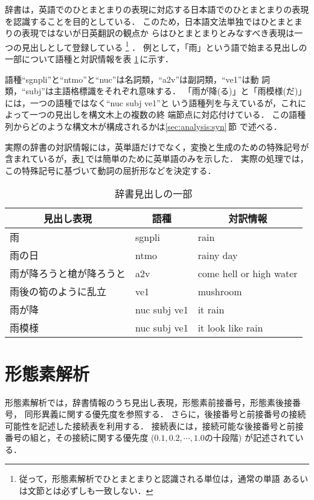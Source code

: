 辞書は，英語でのひとまとまりの表現に対応する日本語でのひとまとまりの表現
を認識することを目的としている．
このため，日本語文法単独ではひとまとまりの表現ではないが日英翻訳の観点か
らはひとまとまりとみなすべき表現は一つの見出しとして登録している
\footnote{従って，形態素解析でひとまとまりと認識される単位は，通常の単語
あるいは文節とは必ずしも一致しない．}
．
例として，「雨」という語で始まる見出しの一部について語種と対訳情報を表
\ref{tab:dict}\,に示す．

語種``sgnpli''と``ntmo''と``nuc''は名詞類，``a2v''は副詞類，``ve1''は動
詞類，``subj''は主語格標識をそれぞれ意味する．
「雨が降(る)」と「雨模様(だ)」には，一つの語種ではなく``nuc subj ve1''と
いう語種列を与えているが，これによって一つの見出しを構文木上の複数の終
端節点に対応付けている．
この語種列からどのような構文木が構成されるかは\ref{sec:analysis:syn}\,節
で述べる．

実際の辞書の対訳情報には，英単語だけでなく，変換と生成のための特殊記号が
含まれているが，表\ref{tab:dict}\,では簡単のために英単語のみを示した．
実際の処理では，この特殊記号に基づいて動詞の屈折形などを決定する．
\begin{table}[tbhp]
\caption{辞書見出しの一部}
\label{tab:dict}
\begin{center}
\begin{tabular}{|l||l|l|}\hline
\multicolumn{1}{|c||}{見出し表現}&\multicolumn{1}{c|}{語種}&
\multicolumn{1}{c|}{対訳情報}\\\hline\hline
雨                       & sgnpli & rain		       \\
雨の日                   & ntmo   & rainy day                  \\
雨が降ろうと槍が降ろうと & a2v    & come hell or high water    \\
雨後の筍のように乱立     & ve1    & mushroom                   \\
雨が降                   & nuc subj ve1    & it rain           \\
雨模様                   & nuc subj ve1    & it look like rain \\\hline
\end{tabular}
\end{center}
\end{table}

\section{形態素解析}
\label{sec:analysis:morph}

形態素解析では，辞書情報のうち見出し表現，形態素前接番号，形態素後接番号，
同形異義に関する優先度を参照する．
さらに，後接番号と前接番号の接続可能性を記述した接続表を利用する．
接続表には，接続可能な後接番号と前接番号の組と，その接続に関する優先度
($0.1, 0.2, \cdots, 1.0$の十段階)
が記述されている．


